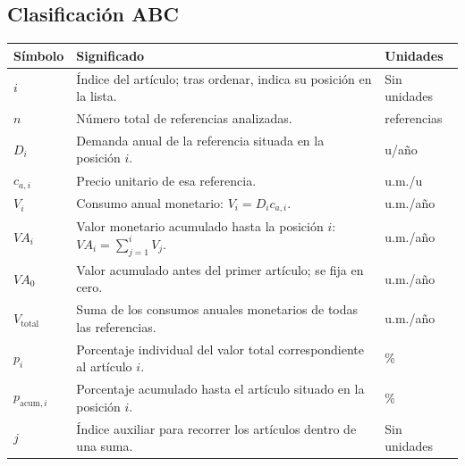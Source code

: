 \documentclass[11pt,a4paper]{article}
\begin{document}
\subsection{Clasificación ABC}
\begin{longtable}{@{}p{2cm}p{8cm}p{3.5cm}@{}}
    \toprule
    Símbolo             & Significado                                                                & Unidades     \\
    \midrule
    \endhead
    $i$                 & Índice del artículo; tras ordenar, indica su posición en la lista.         & Sin unidades \\
    $n$                 & Número total de referencias analizadas.                                    & referencias  \\
    $D_i$               & Demanda anual de la referencia situada en la posición $i$.                 & u/año        \\
    $c_{a,i}$           & Precio unitario de esa referencia.                                         & u.m./u       \\
    $V_i$               & Consumo anual monetario: $V_i=D_i c_{a,i}$.                                & u.m./año     \\
    $VA_i$              & Valor monetario acumulado hasta la posición $i$: $VA_i=\sum_{j=1}^{i}V_j$. & u.m./año     \\
    $VA_0$              & Valor acumulado antes del primer artículo; se fija en cero.                & u.m./año     \\
    $V_{\text{total}}$  & Suma de los consumos anuales monetarios de todas las referencias.          & u.m./año     \\
    $p_i$               & Porcentaje individual del valor total correspondiente al artículo $i$.     & \%           \\
    $p_{\text{acum},i}$ & Porcentaje acumulado hasta el artículo situado en la posición $i$.         & \%           \\
    $j$                 & Índice auxiliar para recorrer los artículos dentro de una suma.            & Sin unidades \\
    \bottomrule
\end{longtable}
\end{document}
